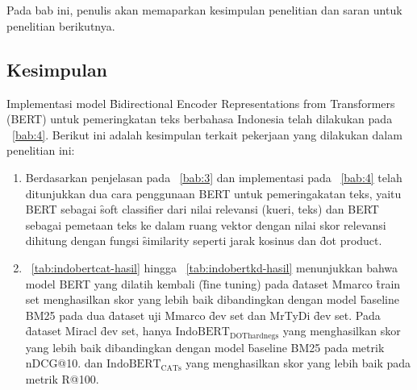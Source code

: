 \chapter{\kesimpulan}
\label{bab:6}
Pada bab ini, penulis akan memaparkan kesimpulan penelitian dan saran untuk penelitian berikutnya.


\section{Kesimpulan}
\label{sec:kesimpulan}
Implementasi model \f{Bidirectional Encoder Representations from Transformers} (BERT) untuk pemeringkatan teks berbahasa Indonesia telah dilakukan pada \sect~\ref{bab:4}. Berikut ini adalah kesimpulan terkait pekerjaan yang dilakukan dalam penelitian ini:

\begin{enumerate}
	\item  Berdasarkan penjelasan pada \sect~\ref{bab:3} dan implementasi pada \sect~\ref{bab:4} telah ditunjukkan dua cara penggunaan BERT untuk pemeringakatan teks, yaitu BERT sebagai \f{soft classifier} dari nilai relevansi (kueri, teks) dan BERT sebagai pemetaan teks ke dalam ruang vektor dengan nilai skor relevansi dihitung dengan fungsi \f{similarity} seperti jarak kosinus dan \f{dot product}.
	\item \tab~\ref{tab:indobertcat-hasil} hingga \tab~\ref{tab:indobertkd-hasil} menunjukkan bahwa model BERT yang dilatih kembali (\f{fine tuning}) pada \f{dataset} Mmarco \f{train set} menghasilkan skor yang lebih baik dibandingkan dengan model \f{baseline} BM25 pada dua \f{dataset} uji Mmarco \f{dev set} dan MrTyDi \f{dev set}. Pada \f{dataset} Miracl \f{dev set}, hanya $\text{IndoBERT}_{\text{DOThardnegs}}$ yang menghasilkan skor yang lebih baik dibandingkan dengan model \f{baseline} BM25 pada metrik nDCG@10. dan $\text{IndoBERT}_{\text{CATs}}$ yang menghasilkan skor yang lebih baik pada metrik R@100.
\end{enumerate}

